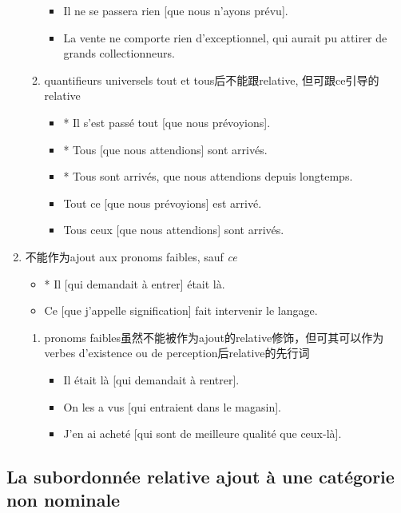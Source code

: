 \documentclass[UTF8]{report}
\begin{document}
\begin{enumerate}
\begin{enumerate}
\begin{itemize}
            \item Il ne se passera rien [que nous n’ayons prévu].
            \item La vente ne comporte rien d’exceptionnel, qui aurait pu attirer de grands collectionneurs.
        \end{itemize}
        \item quantifieurs universels tout et tous后不能跟relative, 但可跟ce引导的relative
        \begin{itemize}
            \item * Il s’est passé tout [que nous prévoyions].
            \item * Tous [que nous attendions] sont arrivés.
            \item * Tous sont arrivés, que nous attendions depuis longtemps.
            \item Tout ce [que nous prévoyions] est arrivé.
            \item Tous ceux [que nous attendions] sont arrivés.
        \end{itemize}
    \end{enumerate}
    \item 不能作为ajout aux pronoms faibles, sauf \textit{ce}
    \begin{itemize}
        \item * Il [qui demandait à entrer] était là.
        \item Ce [que j’appelle signification] fait intervenir le langage.
    \end{itemize}
    \begin{enumerate}
        \item pronoms faibles虽然不能被作为ajout的relative修饰，但可其可以作为verbes d’existence ou de perception后relative的先行词
        \begin{itemize}
            \item Il était là [qui demandait à rentrer].
            \item On les a vus [qui entraient dans le magasin].
            \item J’en ai acheté [qui sont de meilleure qualité que ceux-là].
        \end{itemize}
    \end{enumerate}
\end{enumerate}


\subsection{La subordonnée relative ajout à une catégorie non nominale}
\end{document}
